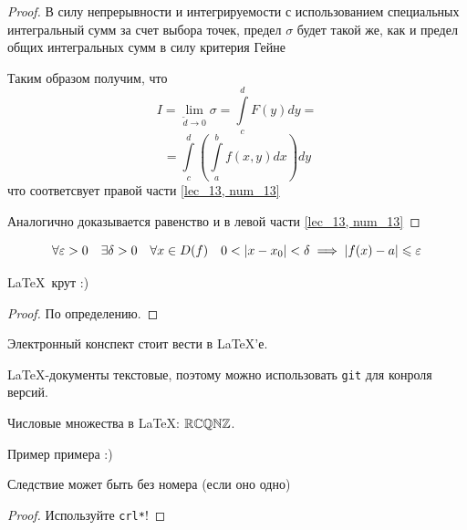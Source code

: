 \documentclass[../../main.tex]{subfiles}
\begin{document}
\begin{proof}
 	В силу непрерывности и интегрируемости с использованием
 	специальных интегральный сумм за счет выбора точек, предел $ \sigma $
 	будет такой же, как и предел общих интегральных сумм 
 	в силу критерия Гейне
 	
 	Таким образом получим, что
 	\[ I = \lim\limits_{ \widetilde{d} \to 0 } \sigma = \int\limits_c^d F \left( y \right) dy =  \]
 	\[ = \int\limits_c^d \left( \int\limits_a^b f \left( x, y\right) dx \right) dy \]
 	что соответсвует правой части \eqref {lec_13, num_13} 
 	
 	Аналогично доказывается равенство и в левой части \eqref {lec_13, num_13} 
\end{proof}




\begin{defn}[Коши]
    \[\forall \varepsilon > 0 \quad \exists \delta > 0 \quad \forall x \in D(f) \quad
      0 < \left|{x-x_0}\right| < \delta \implies \left|{f(x) - a}\right| \leqslant \varepsilon\]
\end{defn}

\begin{thm}
    \LaTeX\ крут :)
\end{thm}

\begin{proof}
    По определению.
\end{proof}

\begin{crl}
    Электронный конспект стоит вести в \LaTeX'е.
\end{crl}

\begin{crl}
    \LaTeX-документы текстовые,
    поэтому можно использовать \texttt{git} для конроля версий.
\end{crl}

\begin{rem}
    Числовые множества в \LaTeX: $\mathbb{R}\mathbb{C}\mathbb{Q}\mathbb{N}\mathbb{Z}$.
\end{rem}

\begin{exmp}
    Пример примера :)
\end{exmp}


\begin{lem}
 Следствие может быть без номера (если оно одно)
\end{lem}

\begin{proof}
 Используйте \texttt{crl*}!
\end{proof}
\end{document}
